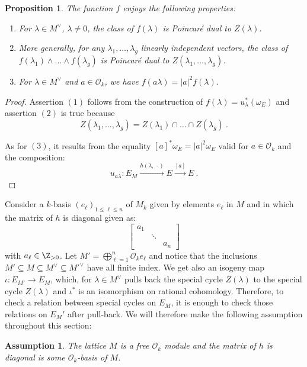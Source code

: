 \documentclass[11pt,letterpaper,english]{amsart}
\numberwithin{equation}{subsection}
\numberwithin{equation}{section}
\newcommand\cO{{\mathcal O}}
\theoremstyle{plain}
\newtheorem{proposition}[theorem]{Proposition}
\newtheorem{assumption}[theorem]{Assumption}
\theoremstyle{remark}
\begin{document}
\begin{proposition}
The function $f$ enjoys the following properties: 
    \begin{enumerate}
        \item For $\lambda\in M^\vee$, $\lambda\neq 0$, the class of $f(\lambda)$ is Poincar\'e dual to $Z(\lambda)$. 
        \item More generally, for any $\lambda_1,\ldots,\lambda_g$ linearly independent vectors, the class of $f(\lambda_1)\wedge\ldots\wedge f(\lambda_g)$ is Poincar\'e dual to $Z(\lambda_1,\ldots,\lambda_g)$.
        \item For $\lambda\in M^\vee$ and $a\in\mathcal{O}_k$, we have $f(a\lambda)=|a|^2f(\lambda)$. 
    \end{enumerate}
\end{proposition}
\begin{proof}
Assertion $(1)$ follows from the construction of $f(\lambda)=u^*_{\lambda}(\omega_E)$ and assertion $(2)$ is true because \[Z(\lambda_1,\ldots,\lambda_g)=Z(\lambda_1)\cap\ldots \cap Z(\lambda_g)~.\]

As for $(3)$, it results from the equality $[a]^*\omega_E=|a|^2\omega_E$ valid for $a\in\mathcal{O}_k$ and the composition: 
    \[u_{a\lambda}:E_M\xrightarrow{h(\lambda,\,\cdot)} E\xrightarrow{[a]} E~.\]
\end{proof}






\medskip 



Consider a $k$-basis $(e_\ell)_{1
\leq \ell\leq n}$ of $M_k$ given by elements $e_\ell$ in $M$ and in which the matrix of $h$ is diagonal given as:
  $$\begin{bmatrix}
    a_{1} & & \\
    & \ddots & \\
    & & a_{n}
  \end{bmatrix}$$ with $a_\ell\in\Z_{>0}$.
Let $M'=\bigoplus_{\ell=1}^n \cO_ke_\ell$ and notice that the inclusions $M'\subseteq M\subseteq M^\vee\subseteq M'^\vee$ have all finite index. We get also an isogeny map $\iota: E_{M'}\rightarrow E_{M}$, which, for $\lambda \in M^\vee $ pulls back the special cycle $Z(\lambda)$ to the special cycle $Z(\lambda)$ and $\iota^*$ is an isomorphism on rational cohomology. Therefore, to check a relation between special cycles on $E_M$, it is enough to check those relations on $E_M'$ after pull-back. We will therefore make the following assumption throughout this section: 
\begin{assumption}
   The lattice $M$ is a free $\mathcal{O}_k$ module and the matrix of $h$ is diagonal is some $\cO_k$-basis of $M$. 
\end{assumption}
\end{document}
